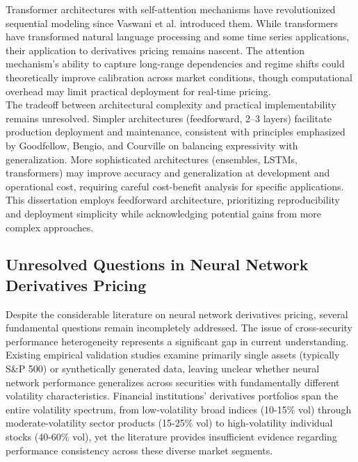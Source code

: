 \documentclass[12pt,a4paper]{article}
\begin{document}
Transformer architectures with self-attention mechanisms have revolutionized sequential modeling since Vaswani et al. \cite{Vaswani2023} introduced them. While transformers have transformed natural language processing and some time series applications, their application to derivatives pricing remains nascent. The attention mechanism's ability to capture long-range dependencies and regime shifts could theoretically improve calibration across market conditions, though computational overhead may limit practical deployment for real-time pricing.\\[0.05cm]

The tradeoff between architectural complexity and practical implementability remains unresolved. Simpler architectures (feedforward, 2--3 layers) facilitate production deployment and maintenance, consistent with principles emphasized by Goodfellow, Bengio, and Courville \cite{Goodfellow-et-al-2016} on balancing expressivity with generalization. More sophisticated architectures (ensembles, LSTMs, transformers) may improve accuracy and generalization at development and operational cost, requiring careful cost-benefit analysis for specific applications. This dissertation employs feedforward architecture, prioritizing reproducibility and deployment simplicity while acknowledging potential gains from more complex approaches.

\subsection{Unresolved Questions in Neural Network Derivatives Pricing}

Despite the considerable literature on neural network derivatives pricing, several fundamental questions remain incompletely addressed. The issue of cross-security performance heterogeneity represents a significant gap in current understanding. Existing empirical validation studies examine primarily single assets (typically S\&P 500) or synthetically generated data, leaving unclear whether neural network performance generalizes across securities with fundamentally different volatility characteristics. Financial institutions' derivatives portfolios span the entire volatility spectrum, from low-volatility broad indices (10-15\% vol) through moderate-volatility sector products (15-25\% vol) to high-volatility individual stocks (40-60\% vol), yet the literature provides insufficient evidence regarding performance consistency across these diverse market segments.\\[0.05cm]
\end{document}
